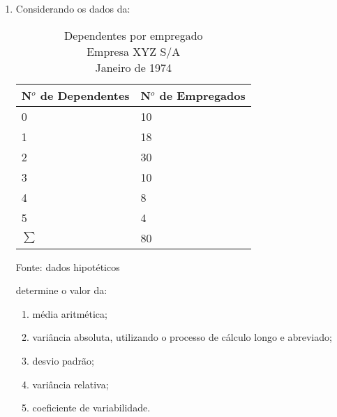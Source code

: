 \begin{enumerate}
\item Considerando os dados da:
	\begin{table}[!htb]
	\centering
	\caption{Dependentes por empregado \\ Empresa XYZ S/A \\ Janeiro de 1974}
	\vspace{0.5cm}
	\begin{tabular}{ll}
	N$^o$ de Dependentes & N$^o$ de Empregados \\ \hline 
	0                    & 10                  \\
	1                    & 18                  \\
	2                    & 30                  \\
	3                    & 10                  \\
	4                    & 8                   \\
	5                    & 4                   \\ \hline 
	$\sum$  & 80  \\ \hline 
	\end{tabular}
	\newline \newline Fonte: dados hipotéticos
	\end{table}
	determine o valor da:
	\begin{enumerate}
		\item média aritmética;
		\item variância absoluta, utilizando o processo de cálculo longo e abreviado;
		\item desvio padrão;
		\item variância relativa;
		\item coeficiente de variabilidade.
	\end{enumerate}


\end{enumerate}
